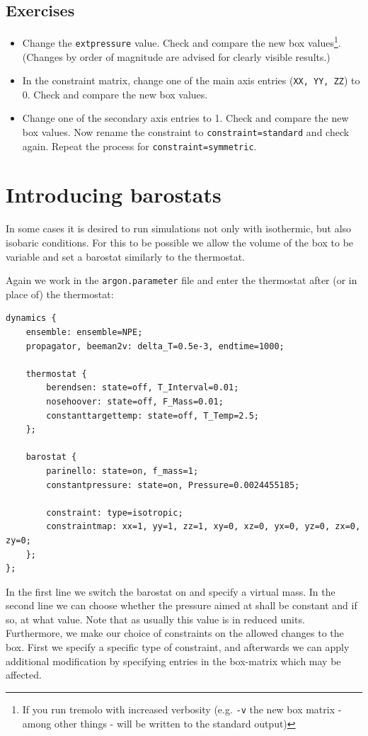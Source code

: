 \subsection{Exercises}
\begin{itemize}
 \item Change the \texttt{extpressure} value. Check and compare the new box values\footnote{If you run tremolo with increased verbosity (e.g. \texttt{-v} the new box matrix - among other things - will be written to the standard output)}. (Changes by order of magnitude are advised for clearly visible results.)
 \item In the constraint matrix, change one of the main axis entries (\texttt{XX, YY, ZZ}) to 0. Check and compare the new box values.
 \item Change one of the secondary axis entries to 1.
  Check and compare the new box values. Now rename the constraint to \texttt{constraint=standard} and check again. 
  Repeat the process for \texttt{constraint=symmetric}.
\end{itemize}


\section{Introducing barostats}
\label{tutorial:barostat}
In some cases it is desired to run simulations not only with isothermic, but also isobaric conditions.
For this to be possible we allow the volume of the box to be variable and set a barostat similarly to the thermostat.

Again we work in the \texttt{argon.parameter} file and enter the thermostat after (or in place of) the thermostat: 
\begin{lstlisting}
dynamics {
    ensemble: ensemble=NPE;
    propagator, beeman2v: delta_T=0.5e-3, endtime=1000;

    thermostat {
        berendsen: state=off, T_Interval=0.01;
        nosehoover: state=off, F_Mass=0.01;
        constanttargettemp: state=off, T_Temp=2.5;
    };

    barostat {
        parinello: state=on, f_mass=1;
        constantpressure: state=on, Pressure=0.0024455185;

        constraint: type=isotropic;
        constraintmap: xx=1, yy=1, zz=1, xy=0, xz=0, yx=0, yz=0, zx=0, zy=0;
    };
};
\end{lstlisting} 
In the first line we switch the barostat on and specify a virtual mass.
In the second line we can choose whether the pressure aimed at shall be constant and if so, at what value. Note that as usually this value is in reduced units.
Furthermore, we make our choice of constraints on the allowed changes to the box. First we specify a specific type of constraint, and afterwards we can apply
additional modification by specifying entries in the box-matrix which may be affected.

